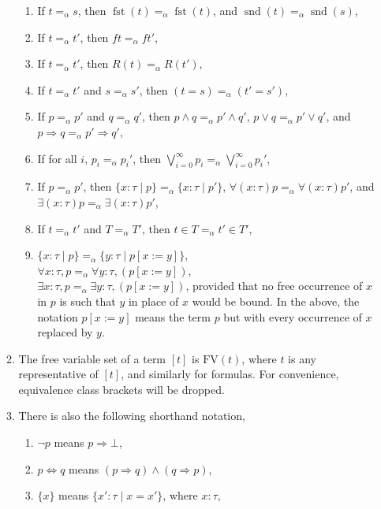 \documentclass{tac}
\begin{document}
\begin{definition}
\begin{enumerate}
\begin{enumerate}
\begin{enumerate}
					\item If $t =_\alpha s$, then $\operatorname{fst}(t) =_\alpha \operatorname{fst}(t)$, and $\operatorname{snd}(t) =_\alpha \operatorname{snd}(s)$,
					\item If $t =_\alpha t'$, then $ft =_\alpha ft'$,
					\item If $t =_\alpha t'$, then $R(t) =_\alpha R(t')$,
					\item If $t =_\alpha t'$ and $s =_\alpha s'$, then $(t = s) =_\alpha (t' = s')$,
					\item If $p =_\alpha p'$ and $q =_\alpha q'$, then $p \wedge q =_\alpha p' \wedge q'$, $p \vee q =_\alpha p' \vee q'$, and $p \Rightarrow q =_\alpha p' \Rightarrow q'$,
					\item If for all $i$, $p_i =_\alpha p_i'$, then $\bigvee_{i = 0}^\infty p_i =_\alpha \bigvee_{i = 0}^\infty p_i'$,
					\item If $p =_\alpha p'$, then $\lbrace x : \tau\mid p\rbrace =_\alpha \lbrace x : \tau \mid p'\rbrace$, $\forall (x : \tau)p =_\alpha \forall (x : \tau)p'$, and $\exists (x : \tau)p =_\alpha \exists(x : \tau)p'$,
					\item If $t =_\alpha t'$ and $T =_\alpha T'$, then $t \in T =_\alpha t' \in T'$,
					\item $\lbrace x : \tau \mid p\rbrace =_\alpha \lbrace y : \tau \mid p[x:=y]\rbrace$,\\
					$\forall x : \tau,p =_\alpha \forall y : \tau,(p[x:= y])$,\\
					$\exists x : \tau,p =_\alpha \exists y : \tau,(p[x :=y])$, provided that no free occurrence of $x$ in $p$ is such that $y$ in place of $x$ would be bound. In the above, the notation $p[x:=y]$ means the term $p$ but with every occurrence of $x$ replaced by $y$.
				\end{enumerate}
				\item The free variable set of a term $[t]$ is $\text{FV}(t)$, where $t$ is any representative of $[t]$, and similarly for formulas. For convenience, equivalence class brackets will be dropped.
				\item There is also the following shorthand notation,
				\begin{enumerate}
					\item $\neg p$ means $p \Rightarrow \bot$,
					\item $p \Leftrightarrow q$ means $(p \Rightarrow q) \wedge (q \Rightarrow p)$,
					\item $\lbrace x \rbrace$ means $\lbrace x' : \tau \mid x = x'\rbrace$, where $x : \tau$,

\end{enumerate}
\end{enumerate}
\end{enumerate}
\end{definition}
\end{document}
